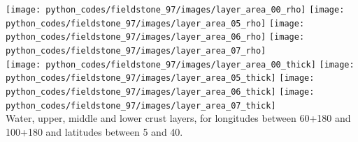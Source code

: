 \begin{center}
\texttt{[image: python\_codes/fieldstone\_97/images/layer\_area\_00\_rho]}
\texttt{[image: python\_codes/fieldstone\_97/images/layer\_area\_05\_rho]}
\texttt{[image: python\_codes/fieldstone\_97/images/layer\_area\_06\_rho]}
\texttt{[image: python\_codes/fieldstone\_97/images/layer\_area\_07\_rho]}\\
\texttt{[image: python\_codes/fieldstone\_97/images/layer\_area\_00\_thick]}
\texttt{[image: python\_codes/fieldstone\_97/images/layer\_area\_05\_thick]}
\texttt{[image: python\_codes/fieldstone\_97/images/layer\_area\_06\_thick]}
\texttt{[image: python\_codes/fieldstone\_97/images/layer\_area\_07\_thick]}\\
{\captionfont Water, upper, middle and lower crust layers, for longitudes between
60+180 and 100+180 and latitudes between 5 and 40.}
\end{center}

